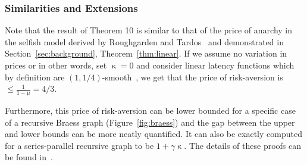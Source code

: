 \subsubsection{Similarities and Extensions} Note that the result of Theorem 10 is similar to that of the price of anarchy in the selfish model derived by Roughgarden and Tardos~\cite{tardos} and demonstrated in Section~\ref{sec:background}, Theorem~\ref{thm:linear}. If we assume no variation in prices or in other words, 
set $\upkappa = 0$ and consider linear latency functions which by definition are $(1, 1/4)$-smooth~\cite{tardos-notes}, we get that the price of risk-aversion is $\leq \displaystyle \frac{1}{1 - \mu} = 4/3$.

Furthermore, this price of risk-aversion can be lower bounded for a specific case of a recursive Braess graph (Figure~\ref{fig:braess}) and the gap between the upper and
lower bounds can be more neatly quantified. It can also be exactly computed for a series-parallel recursive graph to be $1 + \gamma \upkappa$. The details of these proofs can be found
in~\cite{risk-averse}.
